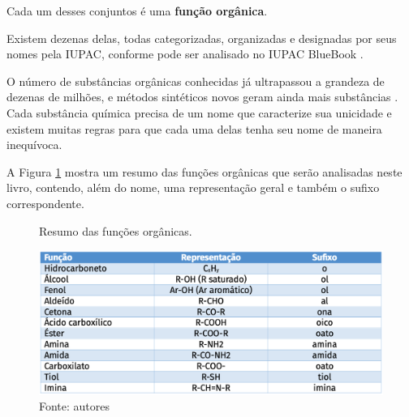 Cada um desses conjuntos é uma \textbf{função orgânica}.

Existem dezenas delas, todas categorizadas, organizadas e designadas por seus nomes pela IUPAC, conforme pode ser analisado no IUPAC BlueBook \cite{iupac2013}.

O número de substâncias orgânicas conhecidas já ultrapassou a grandeza de dezenas de milhões, e métodos sintéticos novos geram ainda mais substâncias \cite{doi:10.1021/acs.jmedchem.2c00223}. Cada substância química precisa de um nome que caracterize sua unicidade e existem muitas regras para que cada uma delas tenha seu nome de maneira inequívoca.

A Figura \ref{fig:funcoes2} mostra um resumo das funções orgânicas que serão analisadas neste livro, contendo, além do nome, uma representação geral e também o sufixo correspondente.

\begin{figure}[h]
	\centering
	\caption{Resumo das funções orgânicas.}
	\vspace{0.5cm}
	\includegraphics[width=1\linewidth]{imagens/funcoes.png}
	\caption*{Fonte: autores}
	\label{fig:funcoes2}
\end{figure}

